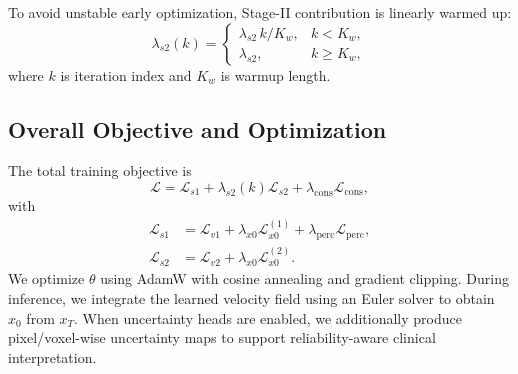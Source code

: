 To avoid unstable early optimization, Stage-II contribution is linearly warmed up:
\begin{equation}
 \lambda_{s2}(k)=\begin{cases}
 \lambda_{s2}\,k/K_w, & k<K_w,\\
 \lambda_{s2}, & k\ge K_w,
 \end{cases}
\end{equation}
where $k$ is iteration index and $K_w$ is warmup length.

\subsection{Overall Objective and Optimization}
\label{subsec:objective}
The total training objective is
\begin{equation}
 \mathcal{L}=\mathcal{L}_{s1}+\lambda_{s2}(k)\mathcal{L}_{s2}+\lambda_{\mathrm{cons}}\mathcal{L}_{\mathrm{cons}},
 \label{eq:total}
\end{equation}
with
\begin{align}
 \mathcal{L}_{s1}&=\mathcal{L}_{v1}+\lambda_{x0}\mathcal{L}_{x0}^{(1)}+\lambda_{\mathrm{perc}}\mathcal{L}_{\mathrm{perc}},\\
 \mathcal{L}_{s2}&=\mathcal{L}_{v2}+\lambda_{x0}\mathcal{L}_{x0}^{(2)}.
\end{align}
We optimize $\theta$ using AdamW with cosine annealing and gradient clipping. During inference, we integrate the learned velocity field using an Euler solver to obtain $\hat x_0$ from $x_T$. When uncertainty heads are enabled, we additionally produce pixel/voxel-wise uncertainty maps to support reliability-aware clinical interpretation.

